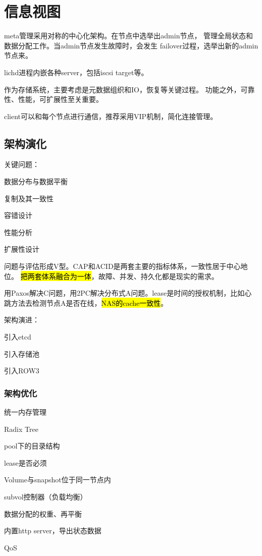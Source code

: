\chapter{信息视图}

meta管理采用对称的中心化架构。在节点中选举出admin节点，
管理全局状态和数据分配工作。当admin节点发生故障时，会发生
failover过程，选举出新的admin节点来。

lichd进程内嵌各种server，包括iscsi target等。

作为存储系统，主要考虑是元数据组织和IO，恢复等关键过程。
功能之外，可靠性、性能，可扩展性至关重要。

client可以和每个节点进行通信，推荐采用VIP机制，简化连接管理。

\section{架构演化}

关键问题：
\begin{enumbox}
\item 数据分布与数据平衡
\item 复制及其一致性
\item 容错设计
\item 性能分析
\item 扩展性设计
\end{enumbox}

问题与评估形成V型。CAP和ACID是两套主要的指标体系，一致性居于中心地位。
\hl{把两套体系融合为一体}，故障、并发、持久化都是现实的需求。

用Paxos解决C问题，用2PC解决分布式A问题。lease是时间的授权机制，比如心跳方法去检测节点A是否在线，\hl{NAS的cache一致性}。

架构演进：
\begin{enumbox}
\item{引入etcd}
\item{引入存储池}
\item{引入ROW3}
\end{enumbox}

\subsection{架构优化}

\begin{enumbox}
\item 统一内存管理
\item Radix Tree
\item pool下的目录结构
\item lease是否必须
\item Volume与snapshot位于同一节点内
\item subvol控制器（负载均衡）
\item 数据分配的权重、再平衡
\item 内置http server，导出状态数据
\item QoS
\end{enumbox}


